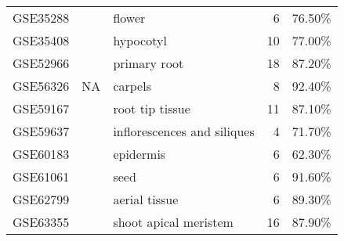 \documentclass[letterpaper,12pt]{article}
\begin{document}
\begin{table}[!ht]
\begin{tabular}{lrlrr}
		GSE35288 & \cite{niederhuth2013transcriptional} & flower                      & 6  & 76.50\% \\
		GSE35408 & \cite{bai2012brassinosteroid}        & hypocotyl                   & 10 & 77.00\%    \\
		GSE52966 & \cite{chaiwanon2015spatiotemporal}   & primary root                & 18 & 87.20\% \\
		GSE56326 & NA                                     & carpels                     & 8  & 92.40\% \\
		GSE59167 & \cite{pallakies2014cle40}            & root tip tissue             & 11 & 87.10\% \\
		GSE59637 & \cite{mizzotti2014seedstick}         & inflorescences and siliques & 4  & 71.70\% \\
		GSE60183 & \cite{kimura2015flowering}           & epidermis					  & 6  & 62.30\% \\
		GSE61061 & \cite{macgregor2015seed}   	        & seed                        & 6  & 91.60\% \\
		GSE62799 & \cite{groth2014snf2}                 & aerial tissue               & 6  & 89.30\% \\
		GSE63355 & \cite{liu2015repair}                 & shoot apical meristem       & 16 & 87.90\%  \\ \hline
	\end{tabular}
\end{table}



\clearpage
\end{document}
